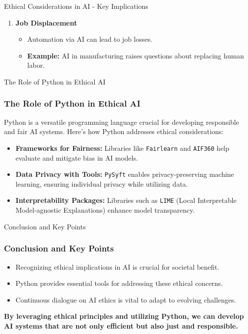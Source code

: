 \documentclass[aspectratio=169]{beamer}
\begin{document}
\begin{frame}[fragile]{Ethical Considerations in AI - Key Implications}
\begin{enumerate}
        \item \textbf{Job Displacement}
            \begin{itemize}
                \item Automation via AI can lead to job losses.
                \item \textbf{Example:} AI in manufacturing raises questions about replacing human labor.
            \end{itemize}
    \end{enumerate}
\end{frame}

\begin{frame}[fragile]{The Role of Python in Ethical AI}
    \frametitle{The Role of Python in Ethical AI}
    Python is a versatile programming language crucial for developing responsible and fair AI systems. Here's how Python addresses ethical considerations:

    \begin{itemize}
        \item \textbf{Frameworks for Fairness:} 
            Libraries like \texttt{Fairlearn} and \texttt{AIF360} help evaluate and mitigate bias in AI models.
        
        \item \textbf{Data Privacy with Tools:} 
            \texttt{PySyft} enables privacy-preserving machine learning, ensuring individual privacy while utilizing data.

        \item \textbf{Interpretability Packages:} 
            Libraries such as \texttt{LIME} (Local Interpretable Model-agnostic Explanations) enhance model transparency.
    \end{itemize}
\end{frame}

\begin{frame}[fragile]{Conclusion and Key Points}
    \frametitle{Conclusion and Key Points}
    \begin{itemize}
        \item Recognizing ethical implications in AI is crucial for societal benefit.
        \item Python provides essential tools for addressing these ethical concerns.
        \item Continuous dialogue on AI ethics is vital to adapt to evolving challenges.
    \end{itemize}

    \textbf{By leveraging ethical principles and utilizing Python, we can develop AI systems that are not only efficient but also just and responsible.}
\end{frame}
\end{document}
